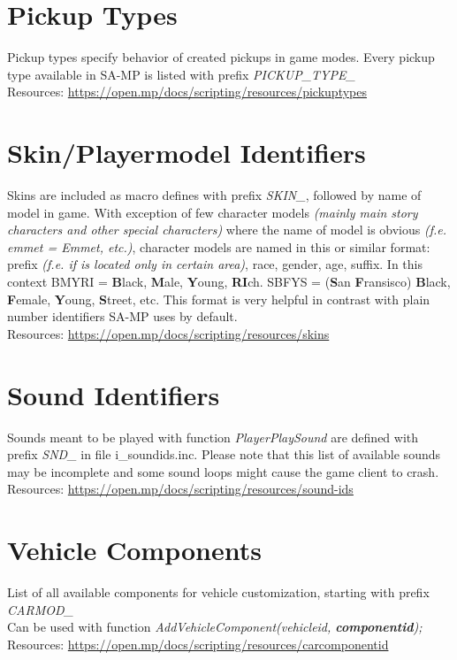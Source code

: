 \documentclass{article}
\begin{document}
\section{Pickup Types}
Pickup types specify behavior of created pickups in game modes. Every pickup type available in SA-MP is listed with prefix \textit{PICKUP\_TYPE\_}
\bigskip
\\Resources: \url{https://open.mp/docs/scripting/resources/pickuptypes}


\section{Skin/Playermodel Identifiers}
Skins are included as macro defines with prefix \textit{SKIN\_}, followed by name of model in game. With exception of few character models \textit{(mainly main story characters and other special characters)} where the name of model is obvious \textit{(f.e. emmet = Emmet, etc.)}, character models are named in this or similar format: prefix \textit{(f.e. if is located only in certain area)}, race, gender, age, suffix. In this context BMYRI = \textbf{B}lack, \textbf{M}ale, \textbf{Y}oung, \textbf{RI}ch. SBFYS = (\textbf{S}an \textbf{F}ransisco) \textbf{B}lack, \textbf{F}emale, \textbf{Y}oung, \textbf{S}treet, etc. This format is very helpful in contrast with plain number identifiers SA-MP uses by default.
\bigskip
\\Resources: \url{https://open.mp/docs/scripting/resources/skins}


\section{Sound Identifiers}
Sounds meant to be played with function \textit{PlayerPlaySound} are defined with prefix \textit{SND\_} in file i\_soundids.inc. Please note that this list of available sounds may be incomplete and some sound loops might cause the game client to crash.
\bigskip
\\Resources: \url{https://open.mp/docs/scripting/resources/sound-ids}


\section{Vehicle Components}
List of all available components for vehicle customization, starting with prefix \textit{CARMOD\_}\\Can be used with function \textit{AddVehicleComponent(vehicleid, \textbf{componentid});}
\bigskip
\\Resources: \url{https://open.mp/docs/scripting/resources/carcomponentid}
\end{document}
